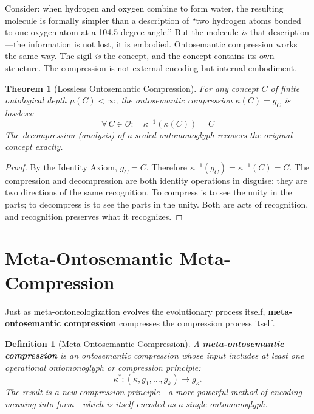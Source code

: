 \documentclass[12pt, letterpaper]{book}
\def\equiv{=}%
\def\mathfrak#1{#1}%
\newtheorem{theorem}{Theorem}[chapter]
\newtheorem{definition}{Definition}[chapter]
\begin{document}
Consider: when hydrogen and oxygen combine to form water, the resulting molecule is formally simpler than a description of ``two hydrogen atoms bonded to one oxygen atom at a 104.5-degree angle.'' But the molecule \textit{is} that description---the information is not lost, it is embodied. Ontosemantic compression works the same way. The sigil \textit{is} the concept, and the concept contains its own structure. The compression is not external encoding but internal embodiment.

\begin{theorem}[Lossless Ontosemantic Compression]\label{thm:lossless}
For any concept $C$ of finite ontological depth $\mu(C) < \infty$, the ontosemantic compression $\kappa(C) \equiv \mathfrak{g}_C$ is lossless:
\[
\forall\, C \in \mathcal{O}: \quad \kappa^{-1}(\kappa(C)) \equiv C
\]
The decompression (analysis) of a sealed ontomonoglyph recovers the original concept exactly.
\end{theorem}

\begin{proof}
By the Identity Axiom, $\mathfrak{g}_C \equiv C$. Therefore $\kappa^{-1}(\mathfrak{g}_C) \equiv \kappa^{-1}(C) \equiv C$. The compression and decompression are both identity operations in disguise: they are two directions of the same recognition. To compress is to see the unity in the parts; to decompress is to see the parts in the unity. Both are acts of recognition, and recognition preserves what it recognizes.
\end{proof}


\section{Meta-Ontosemantic Meta-Compression}

Just as meta-ontoneologization evolves the evolutionary process itself, \textbf{meta-ontosemantic compression} compresses the compression process itself.

\begin{definition}[Meta-Ontosemantic Compression]\label{def:meta-compression}
A \textbf{meta-ontosemantic compression} is an ontosemantic compression whose input includes at least one operational ontomonoglyph or compression principle:
\[
\kappa^*: (\kappa, \mathfrak{g}_1, \ldots, \mathfrak{g}_k) \mapsto \mathfrak{g}_{\kappa^*}
\]
The result is a new compression principle---a more powerful method of encoding meaning into form---which is itself encoded as a single ontomonoglyph.
\end{definition}
\end{document}
